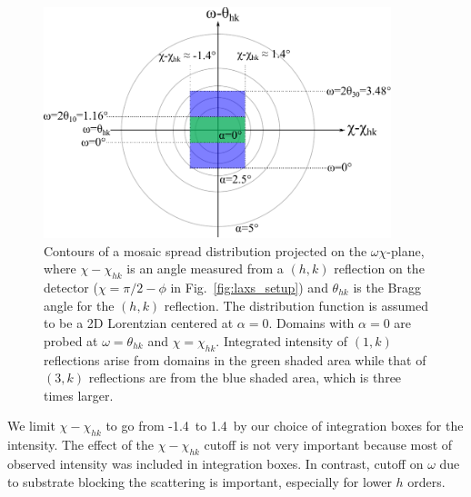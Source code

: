\begin{figure}[htbp]
  \centering
  \includegraphics[width=0.9\textwidth]{figures/ripple/analysis/mosaic_contour}
  \caption{Contours of a mosaic spread distribution projected on the $\omega\chi$-plane,
  where $\chi-\chi_{hk}$ is an angle measured from a $(h,k)$ reflection on the detector
  ($\chi=\pi/2-\phi$ in Fig.~\ref{fig:laxs_setup}) and $\theta_{hk}$ is the
  Bragg angle for the $(h,k)$ reflection.
  The distribution function is assumed to be a 2D Lorentzian centered at $\alpha=0$.
  Domains with $\alpha=0$ are probed at $\omega=\theta_{hk}$ and $\chi=\chi_{hk}$.
  Integrated intensity of $(1,k)$ reflections arise from domains in the green
  shaded area while that of $(3,k)$ reflections are from the
  blue shaded area, which is three times larger.}
  \label{fig:mosaic_contour} 
\end{figure}

We limit $\chi-\chi_{hk}$ to go from -1.4\textdegree\ to 1.4\textdegree\
by our choice of integration boxes for the intensity.  
The effect of the $\chi-\chi_{hk}$ cutoff is not very important
because most of observed intensity was included in integration boxes.
In contrast, cutoff on $\omega$ due to substrate blocking the scattering
is important, especially for lower $h$ orders.
 
